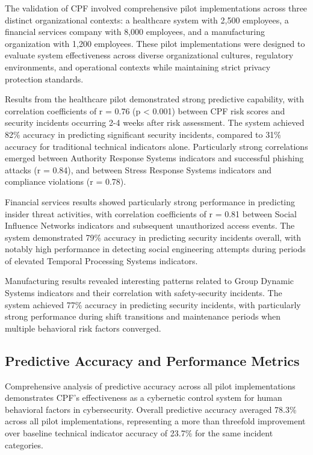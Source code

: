 \documentclass[journal]{IEEEtran}
\begin{document}
The validation of CPF involved comprehensive pilot implementations across three distinct organizational contexts: a healthcare system with 2,500 employees, a financial services company with 8,000 employees, and a manufacturing organization with 1,200 employees. These pilot implementations were designed to evaluate system effectiveness across diverse organizational cultures, regulatory environments, and operational contexts while maintaining strict privacy protection standards.

Results from the healthcare pilot demonstrated strong predictive capability, with correlation coefficients of r = 0.76 (p < 0.001) between CPF risk scores and security incidents occurring 2-4 weeks after risk assessment. The system achieved 82\% accuracy in predicting significant security incidents, compared to 31\% accuracy for traditional technical indicators alone. Particularly strong correlations emerged between Authority Response Systems indicators and successful phishing attacks (r = 0.84), and between Stress Response Systems indicators and compliance violations (r = 0.78).

Financial services results showed particularly strong performance in predicting insider threat activities, with correlation coefficients of r = 0.81 between Social Influence Networks indicators and subsequent unauthorized access events. The system demonstrated 79\% accuracy in predicting security incidents overall, with notably high performance in detecting social engineering attempts during periods of elevated Temporal Processing Systems indicators.

Manufacturing results revealed interesting patterns related to Group Dynamic Systems indicators and their correlation with safety-security incidents. The system achieved 77\% accuracy in predicting security incidents, with particularly strong performance during shift transitions and maintenance periods when multiple behavioral risk factors converged.

\subsection{Predictive Accuracy and Performance Metrics}

Comprehensive analysis of predictive accuracy across all pilot implementations demonstrates CPF's effectiveness as a cybernetic control system for human behavioral factors in cybersecurity. Overall predictive accuracy averaged 78.3\% across all pilot implementations, representing a more than threefold improvement over baseline technical indicator accuracy of 23.7\% for the same incident categories.
\end{document}
